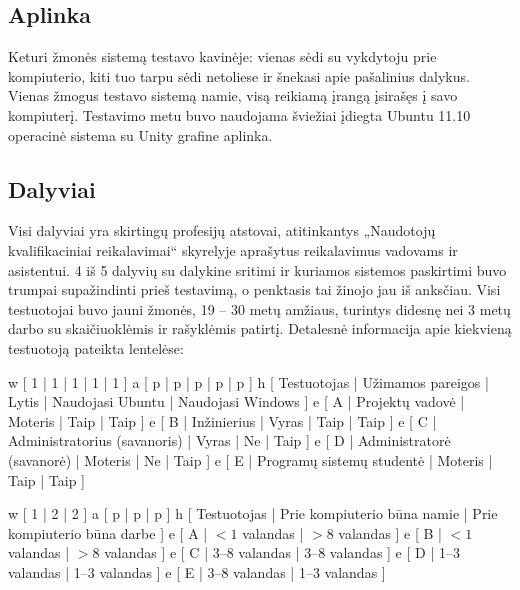 
\subsection{Aplinka}

Keturi žmonės sistemą testavo kavinėje: vienas sėdi su vykdytoju
prie kompiuterio, kiti tuo tarpu sėdi netoliese ir šnekasi apie
pašalinius dalykus. Vienas žmogus testavo sistemą namie, visą
reikiamą įrangą įsirašęs į savo kompiuterį. Testavimo metu buvo
naudojama šviežiai įdiegta Ubuntu 11.10 operacinė sistema su Unity
grafine aplinka.

\subsection{Dalyviai}

Visi dalyviai yra skirtingų profesijų atstovai, atitinkantys
„Naudotojų kvalifikaciniai reikalavimai“ skyrelyje aprašytus reikalavimus
vadovams ir asistentui. 4 iš 5 dalyvių su dalykine sritimi ir kuriamos
sistemos paskirtimi buvo trumpai supažindinti prieš testavimą, o
penktasis tai žinojo jau iš anksčiau. Visi testuotojai buvo jauni žmonės,
19 – 30 metų amžiaus, turintys didesnę nei 3 metų darbo su skaičiuoklėmis
ir rašyklėmis patirtį. Detalesnė informacija apie kiekvieną testuotoją
pateikta lentelėse:

\xtable
{
  w [ 1 | 1 | 1 | 1 | 1 ]
  a [ p | p | p | p | p ]
  h [
    Testuotojas |
    Užimamos pareigos |
    Lytis |
    Naudojasi Ubuntu |
    Naudojasi Windows
    ]
  e [ A | Projektų vadovė | Moteris | Taip | Taip ]
  e [ B | Inžinierius | Vyras | Taip | Taip ]
  e [ C | Administratorius (savanoris) | Vyras | Ne | Taip ]
  e [ D | Administratorė (savanorė) | Moteris | Ne | Taip ]
  e [ E | Programų sistemų studentė | Moteris | Taip | Taip ]
}

\xtable
{
  w [ 1 | 2 | 2 ]
  a [ p | p | p ]
  h [
    Testuotojas |
    Prie kompiuterio būna namie |
    Prie kompiuterio būna darbe
    ]
  e [ A | $< 1$ valandas | $> 8$ valandas ]
  e [ B | $< 1$ valandas | $> 8$ valandas ]
  e [ C | 3–8 valandas   | 3–8 valandas   ]
  e [ D | 1–3 valandas   | 1–3 valandas   ]
  e [ E | 3–8 valandas   | 1–3 valandas   ]
}
